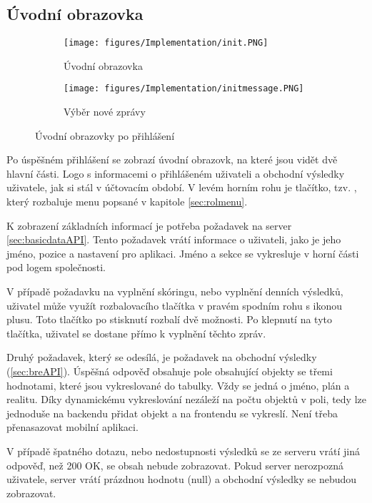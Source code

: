 \documentclass[11pt,twoside,a4paper]{book}
\begin{document}
\subsection{Úvodní obrazovka}
\begin{figure}[ht]
	\centering
	\begin{subfigure}{.4\textwidth}
	  	\centering
	  	\texttt{[image: figures/Implementation/init.PNG]}
	  	\caption{Úvodní obrazovka}
	  	\label{fig:initscreensimplementa}
	\end{subfigure}
	\begin{subfigure}{.4\textwidth}
	  	\centering
		\texttt{[image: figures/Implementation/initmessage.PNG]}
	  	\caption{Výběr nové zprávy}
	  	\label{fig:initscreensimplementb}
	\end{subfigure}
\caption{Úvodní obrazovky po přihlášení}
\label{fig:initscreensimplement}
\end{figure}

Po úspěšném přihlášení se zobrazí úvodní obrazovk, na které jsou vidět dvě hlavní části. Logo s informacemi o přihlášeném uživateli a obchodní výsledky uživatele, jak si stál v účtovacím období. V levém horním rohu je tlačítko, tzv. , který rozbaluje menu popsané v kapitole \ref{sec:rolmenu}.

K zobrazení základních informací je potřeba požadavek na server \ref{sec:basicdataAPI}. Tento požadavek vrátí informace o uživateli, jako je jeho jméno, pozice a nastavení pro aplikaci. Jméno a sekce se vykresluje v horní části pod logem společnosti.

V případě požadavku na vyplnění skóringu, nebo vyplnění denních výsledků, uživatel může využít rozbalovacího tlačítka v pravém spodním rohu s ikonou plusu. Toto tlačítko po stisknutí rozbalí dvě možnosti. Po klepnutí na tyto tlačítka, uživatel se dostane přímo k vyplnění těchto zpráv.

Druhý požadavek, který se odesílá, je požadavek na obchodní výsledky (\ref{sec:breAPI}). Úspěšná odpověď obsahuje pole obsahující objekty se třemi hodnotami, které jsou vykreslované do tabulky. Vždy se jedná o jméno, plán a realitu. Díky dynamickému vykreslování nezáleží na počtu objektů v poli, tedy lze jednoduše na backendu přidat objekt a na frontendu se vykreslí. Není třeba přenasazovat mobilní aplikaci. 

V případě špatného dotazu, nebo nedostupnosti výsledků se ze serveru vrátí jiná odpověď, než 200 OK, se obsah nebude zobrazovat. Pokud server nerozpozná uživatele, server vrátí prázdnou hodnotu (null) a obchodní výsledky se nebudou zobrazovat. 
\end{document}
